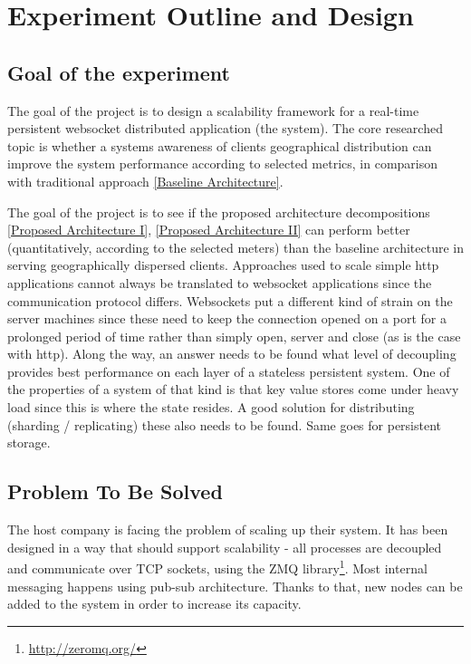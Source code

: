 \documentclass{uvamscse}
\begin{document}
\chapter{Experiment Outline and Design} \label{Experiment Outline and Design}

\section{Goal of the experiment}

The goal of the project is to design a scalability framework for a real-time persistent websocket distributed application (the system). The core researched topic is whether a systems awareness of clients geographical distribution can improve the system performance according to selected metrics, in comparison with traditional approach \ref{Baseline Architecture}.

The goal of the project is to see if the proposed architecture decompositions \ref{Proposed Architecture I}, \ref{Proposed Architecture II} can perform better (quantitatively, according to the selected meters) than the baseline architecture in serving geographically dispersed clients. Approaches used to scale simple http applications cannot always be translated to websocket applications since the communication protocol differs. Websockets put a different kind of strain on the server machines since these need to keep the connection opened on a port for a prolonged period of time rather than simply open, server and close (as is the case with http). Along the way, an answer needs to be found what level of decoupling provides best performance on each layer of a stateless persistent system. One of the properties of a system of that kind is that key value stores come under heavy load since this is where the state resides. A good solution for distributing (sharding / replicating) these also needs to be found. Same goes for persistent storage.

\section{Problem To Be Solved}
The host company is facing the problem of scaling up their system. It has been designed in a way that should support scalability - all processes are decoupled and communicate over TCP sockets, using the ZMQ library\footnote{\url{http://zeromq.org/}}. Most internal messaging happens using pub-sub architecture. Thanks to that, new nodes can be added to the system in order to increase its capacity.
\end{document}
